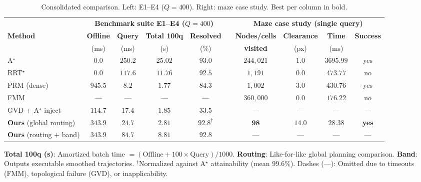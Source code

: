\documentclass[conference]{IEEEtran}
\begin{document}
\begin{table}[htbp]
\caption{Consolidated comparison. Left: E1--E4 ($Q=400$). Right: maze case study. Best per column in bold.}
\label{tab:master}
\begin{center}
\begin{tabular}{@{}l cccc c cccc@{}}
\toprule
& \multicolumn{4}{c}{\textbf{Benchmark suite E1--E4 ($Q=400$)}} & & \multicolumn{4}{c}{\textbf{Maze case study (single query)}} \\
\cmidrule(lr){2-5} \cmidrule(lr){7-10}
\textbf{Method} & \textbf{Offline} & \textbf{Query} & \textbf{Total 100q} & \textbf{Resolved} & & \textbf{Nodes/cells} & \textbf{Clearance} & \textbf{Time} & \textbf{Success} \\
 & (ms) & (ms) & (s) & (\%) & & \textbf{visited} & (px) & (ms) & \\ \midrule
A$^\star$~\cite{hart1968}              & $\mathbf{0.0}$ & $250.2$ & $25.02$ & $\mathbf{93.0}$ & & $244{,}021$ & $1.0$ & $3695.99$ & yes \\
RRT$^\star$~\cite{karaman2011}         & $\mathbf{0.0}$ & $117.6$ & $11.76$ & $92.5$ & & $1{,}191$ & $0.0$ & $473.77$ & no \\
PRM (dense)~\cite{kavraki1996}         & $945.5$ & $\mathbf{8.2}$ & $1.77$ & $84.3$ & & $1{,}002$ & $3.0$ & $430.76$ & yes \\
FMM                                    & --- & --- & --- & --- & & $360{,}000$ & $0.0$ & $176.22$ & no \\
GVD + A$^\star$ inject                 & $114.7$ & $17.4$ & $1.85$ & $33.5$ & & --- & --- & --- & --- \\ \midrule
\textbf{Ours} (global routing)      & $343.9$ & $24.7$ & $\mathbf{2.81}$ & $92.8^{\dagger}$ & & $\mathbf{98}$ & $\mathbf{14.0}$ & $\mathbf{28.38}$ & \textbf{yes} \\
\textbf{Ours} (routing $+$ band)       & $343.9$ & $84.7$ & $8.81$ & $92.8$ & & --- & --- & --- & --- \\ \bottomrule
\end{tabular}
\end{center}
\footnotesize \textbf{Total 100q (s)}: Amortized batch time $= (\text{Offline} + 100 \times \text{Query}) / 1000$. \textbf{Routing}: Like-for-like global planning comparison. \textbf{Band}: Outputs executable smoothed trajectories. $^{\dagger}$Normalized against A$^\star$ attainability (mean $99.6\%$). Dashes (---): Omitted due to timeouts (FMM), topological failure (GVD), or inapplicability.

\end{table}
\end{document}
